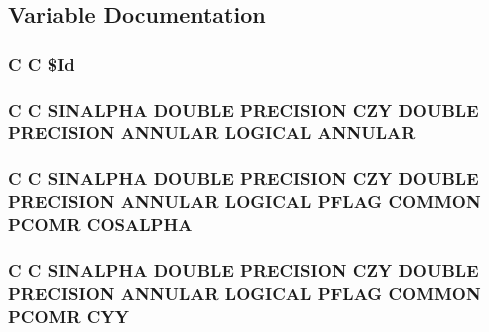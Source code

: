 \subsection{Variable Documentation}
\hypertarget{periodic_8com_af40bd3a96fc1553c00422342f92046b8}{
\subsubsection[{\$\-Id}]{\setlength{\rightskip}{0pt plus 5cm}C C \$Id}}\label{periodic_8com_af40bd3a96fc1553c00422342f92046b8}
\hypertarget{periodic_8com_a4d79b405c5ac65e6460b47e6dd1f4ac4}{
\subsubsection[{A\-N\-N\-U\-L\-A\-R}]{\setlength{\rightskip}{0pt plus 5cm}C C {\bf S\-I\-N\-A\-L\-P\-H\-A} D\-O\-U\-B\-L\-E P\-R\-E\-C\-I\-S\-I\-O\-N {\bf C\-Z\-Y} D\-O\-U\-B\-L\-E P\-R\-E\-C\-I\-S\-I\-O\-N A\-N\-N\-U\-L\-A\-R L\-O\-G\-I\-C\-A\-L A\-N\-N\-U\-L\-A\-R}}\label{periodic_8com_a4d79b405c5ac65e6460b47e6dd1f4ac4}
\hypertarget{periodic_8com_a4b15991d4fb7de518675fda13598d7ff}{
\subsubsection[{C\-O\-S\-A\-L\-P\-H\-A}]{\setlength{\rightskip}{0pt plus 5cm}C C {\bf S\-I\-N\-A\-L\-P\-H\-A} D\-O\-U\-B\-L\-E P\-R\-E\-C\-I\-S\-I\-O\-N {\bf C\-Z\-Y} D\-O\-U\-B\-L\-E P\-R\-E\-C\-I\-S\-I\-O\-N {\bf A\-N\-N\-U\-L\-A\-R} L\-O\-G\-I\-C\-A\-L {\bf P\-F\-L\-A\-G} C\-O\-M\-M\-O\-N P\-C\-O\-M\-R C\-O\-S\-A\-L\-P\-H\-A}}\label{periodic_8com_a4b15991d4fb7de518675fda13598d7ff}
\hypertarget{periodic_8com_a39400ffeeb9beb4a0d25143093c58fca}{
\subsubsection[{C\-Y\-Y}]{\setlength{\rightskip}{0pt plus 5cm}C C {\bf S\-I\-N\-A\-L\-P\-H\-A} D\-O\-U\-B\-L\-E P\-R\-E\-C\-I\-S\-I\-O\-N {\bf C\-Z\-Y} D\-O\-U\-B\-L\-E P\-R\-E\-C\-I\-S\-I\-O\-N {\bf A\-N\-N\-U\-L\-A\-R} L\-O\-G\-I\-C\-A\-L {\bf P\-F\-L\-A\-G} C\-O\-M\-M\-O\-N P\-C\-O\-M\-R C\-Y\-Y}}\label{periodic_8com_a39400ffeeb9beb4a0d25143093c58fca}
